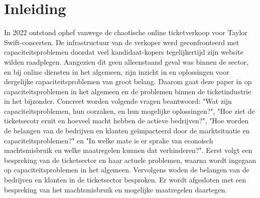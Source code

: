 
\section{Inleiding}

In 2022 ontstond ophef vanwege de chaotische online ticketverkoop voor
Taylor Swift-concerten. De infrastructuur van de verkoper werd
geconfronteerd met capaciteitsproblemen doordat veel kandidaat-kopers
tegelijkertijd zijn website wilden raadplegen. Aangezien dit geen alleenstaand
geval was binnen de sector, en bij online diensten in het algemeen, zijn inzicht
in en oplossingen voor dergelijke capaciteitsproblemen van groot belang. Daarom
gaat deze paper in op capaciteitsproblemen in het algemeen en de problemen
binnen de ticketindustrie in het bijzonder. Concreet worden volgende vragen
beantwoord: "Wat zijn capaciteitsproblemen, hun oorzaken, en hun mogelijke
oplossingen?", "Hoe ziet de ticketsecotr eruit en hoeveel macht hebben de
actieve bedrijven?", "Hoe worden de belangen van de bedrijven en klanten
geïmpacteerd door de marktsituatie en capaciteitsproblemen?" en
"In welke mate is er sprake van econoisch machtsmisbruik en welke maatregelen
kunnen dat verhinderen?". Eerst volgt een bespreking van de ticketsector en
haar actuele problemen, waarna wordt ingegaan op capaciteitsproblemen
in het algemeen. Vervolgens woden de belangen van de bedrijven en klanten
in de ticketsector besproken. Er wordt afgesloten met een bespreking van het
machtsmisbruik en mogelijke maatregelen daartegen.